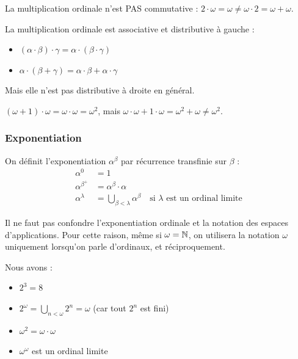 \begin{remarque}
	La multiplication ordinale n'est PAS commutative : $2 \cdot \omega = \omega \neq \omega \cdot 2 = \omega + \omega$.
\end{remarque}

\begin{proposition}
	La multiplication ordinale est associative et distributive à gauche :
	\begin{itemize}
		\item $(\alpha \cdot \beta) \cdot \gamma = \alpha \cdot (\beta \cdot \gamma)$
		\item $\alpha \cdot (\beta + \gamma) = \alpha \cdot \beta + \alpha \cdot \gamma$
	\end{itemize}
	Mais elle n'est pas distributive à droite en général.
\end{proposition}

\begin{exemple}
	$(\omega + 1) \cdot \omega = \omega \cdot \omega = \omega^2$, mais $\omega \cdot \omega + 1 \cdot \omega = \omega^2 + \omega \neq \omega^2$.
\end{exemple}

\subsubsection{Exponentiation}

\begin{definition}
	On définit l'exponentiation $\alpha^\beta$ par récurrence transfinie sur $\beta$ :
	\begin{align*}
		\alpha^0         & = 1                                                                                      \\
		\alpha^{\beta^+} & = \alpha^\beta \cdot \alpha                                                              \\
		\alpha^\lambda   & = \bigcup_{\beta < \lambda} \alpha^\beta \quad \text{si $\lambda$ est un ordinal limite}
	\end{align*}
\end{definition}
\begin{remarque}
    Il ne faut pas confondre l'exponentiation ordinale et la notation des espaces d'applications. Pour cette raison, même si $\omega = \mathbb{N}$, on utilisera la notation $\omega$ uniquement lorsqu'on parle d'ordinaux, et réciproquement.
\end{remarque}
\begin{exemple}
Nous avons :
	\begin{itemize}
		\item $2^3 = 8$
		\item $2^\omega = \bigcup_{n < \omega} 2^n = \omega$ (car tout $2^n$ est fini)
		\item $\omega^2 = \omega \cdot \omega$
		\item $\omega^\omega$ est un ordinal limite
	\end{itemize}
\end{exemple}

